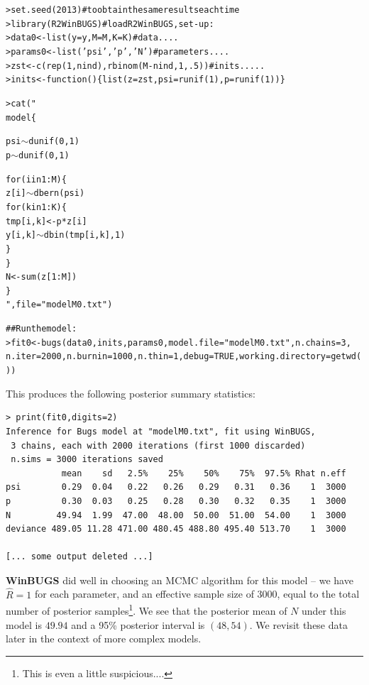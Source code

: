 {\small
\begin{alltt}
> set.seed(2013)                # to obtain the same results each time
> library(R2WinBUGS)            # load R2WinBUGS, set-up:
> data0 <- list(y=y,M=M,K=K)           # data ....
> params0 <- list('psi','p','N')          # parameters .... 
> zst <- c(rep(1,nind),rbinom(M-nind, 1, .5)) # inits .....
> inits <- function()\{  list(z=zst, psi=runif(1), p=runif(1)) \}

> cat("
model\{

psi\( \sim \)dunif(0, 1)
p\( \sim \)dunif(0,1)

for (i in 1:M)\{
   z[i]\( \sim \)dbern(psi)
   for(k in 1:K)\{
     tmp[i,k]<-p*z[i]
     y[i,k]\( \sim \)dbin(tmp[i,k],1)
      \}
    \}
N<-sum(z[1:M])
\}
",file="modelM0.txt")

## Run the model:
> fit0 <- bugs(data0, inits, params0, model.file="modelM0.txt",n.chains=3,
       n.iter=2000, n.burnin=1000, n.thin=1,debug=TRUE,working.directory=getwd())
\end{alltt}
}
This produces the following posterior
 summary statistics:
{\small
\begin{verbatim}
> print(fit0,digits=2)
Inference for Bugs model at "modelM0.txt", fit using WinBUGS,
 3 chains, each with 2000 iterations (first 1000 discarded)
 n.sims = 3000 iterations saved
           mean    sd   2.5%    25%    50%    75%  97.5% Rhat n.eff
psi        0.29  0.04   0.22   0.26   0.29   0.31   0.36    1  3000
p          0.30  0.03   0.25   0.28   0.30   0.32   0.35    1  3000
N         49.94  1.99  47.00  48.00  50.00  51.00  54.00    1  3000
deviance 489.05 11.28 471.00 480.45 488.80 495.40 513.70    1  3000

[... some output deleted ...]
\end{verbatim}
}
{\bf WinBUGS} did well in choosing an MCMC algorithm for this model --
we have $\hat{R} = 1$ for each parameter, and an effective sample size
of 3000, equal to the total number of posterior samples\footnote{This is even a little
suspicious....}.
We see that the posterior mean of $N$ under this
model is $49.94$ and a 95\% posterior interval is $(48,54)$.  We
revisit these data later in the context of more complex models.

